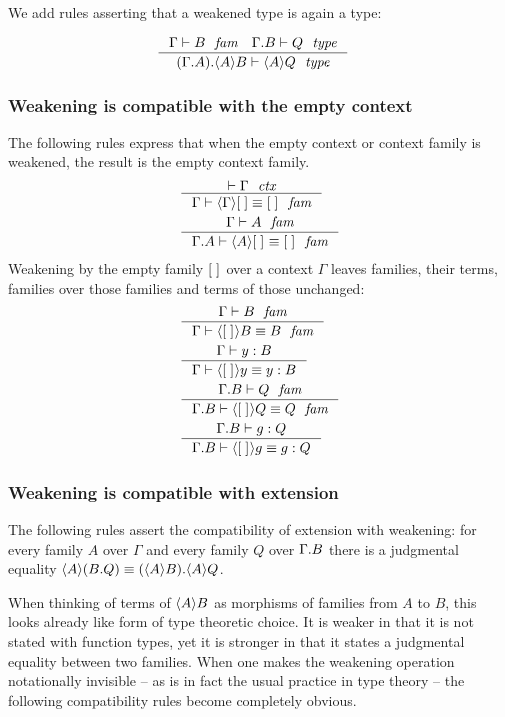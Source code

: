 We add rules asserting that a weakened type is again a type:

\begin{align}
& \inference
  {\jfam{\Gamma}{B}
   \jtype{\ctxext{\Gamma}{B}}{Q}}
  {\jtype{\ctxext{{\Gamma}{A}}{\ctxwk{A}{B}}}{\ctxwk{A}{Q}}}
\end{align}

\subsubsection{Weakening is compatible with the empty context}
The following rules express that when the empty context or context family is
weakened, the result is the empty context family.
\begin{align}
& \inference
  {\jctx{\Gamma}}
  {\jfameq{\Gamma}{\ctxwk{\Gamma}{\emptyc}}{\emptyf}}\\
& \inference
  {\jfam{\Gamma}{A}}
  {\jfameq{{\Gamma}{A}}{\ctxwk{A}{\emptyf}}{\emptyf}}
\end{align}
Weakening by the empty family ${[\;]}_{}$ over a context $\Gamma$ leaves families, 
their terms, families over those families and
terms of those unchanged:
\begin{align}
& \inference
  {\jfam{\Gamma}{B}}
  {\jfameq{\Gamma}{\ctxwk{\emptyf}{B}}{B}}\\
& \inference
  {\jterm{\Gamma}{B}{y}}
  {\jtermeq{\Gamma}{B}{\ctxwk{\emptyf}{y}}{y}}\\
& \inference
  {\jfam{{\Gamma}{B}}{Q}}
  {\jfameq{{\Gamma}{B}}{\ctxwk{\emptyf}{Q}}{Q}}\\
& \inference
  {\jterm{{\Gamma}{B}}{Q}{g}}
  {\jtermeq{{\Gamma}{B}}{Q}{\ctxwk{\emptyf}{g}}{g}}
\end{align}

\subsubsection{Weakening is compatible with extension}\label{comp-we}

The following rules assert the compatibility of extension with weakening: for
every family $A$ over $\Gamma$ and every family $Q$ over $\ctxext{\Gamma}{B}$
there is a
judgmental equality $\ctxwk{A}{\ctxext{B}{Q}}\jdeq\ctxext{\ctxwk{A}{B}}
{\ctxwk{A}{Q}}$. 

When thinking of terms of $\ctxwk{A}{B}$ as morphisms of families from $A$ to
$B$, this looks already like form of type theoretic choice. It is weaker in that
it is not stated with function types, yet it is stronger in that it states a
judgmental equality between two families. When one makes the weakening operation
notationally invisible -- as is in fact the usual practice in type theory -- the
following compatibility rules become completely obvious.


